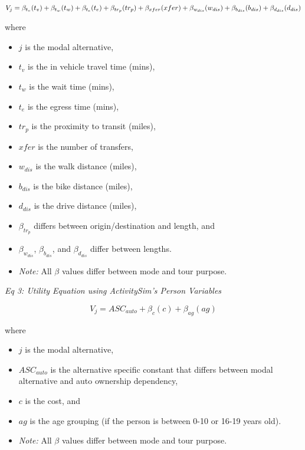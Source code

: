 \documentclass[]{elsarticle} %
\providecommand{\tightlist}{%
  \setlength{\itemsep}{0pt}\setlength{\parskip}{0pt}}
\begin{document}
\begin{equation}
  V_j = \beta_{t_v}(t_v) + \beta_{t_w}(t_w) + \beta_{t_e}(t_e) + \beta_{tr_p}(tr_p) + \beta_{xfer}(xfer) + \beta_{w_{dis}}(w_{dis}) + \\ \beta_{b_{dis}}(b_{dis}) + \beta_{d_{dis}}(d_{dis}) \label{eq:label2}
\end{equation}

where

\begin{itemize}
\tightlist
\item
  \(j\) is the modal alternative,
\item
  \(t_v\) is the in vehicle travel time (mins),
\item
  \(t_w\) is the wait time (mins),
\item
  \(t_e\) is the egress time (mins),
\item
  \(tr_p\) is the proximity to transit (miles),
\item
  \(xfer\) is the number of transfers,
\item
  \(w_{dis}\) is the walk distance (miles),
\item
  \(b_{dis}\) is the bike distance (miles),
\item
  \(d_{dis}\) is the drive distance (miles),
\item
  \(\beta_{tr_p}\) differs between origin/destination and length, and
\item
  \(\beta_{w_{dis}}\), \(\beta_{b_{dis}}\), and \(\beta_{d_{dis}}\) differ between lengths.
\item
  \emph{Note:} All \(\beta\) values differ between mode and tour purpose.
\end{itemize}

\emph{Eq 3: Utility Equation using ActivitySim's Person Variables}

\begin{equation}
  V_j = ASC_{auto} +  \beta_{c}(c) + \beta_{ag}(ag) \label{eq:label3}
\end{equation}

where

\begin{itemize}
\tightlist
\item
  \(j\) is the modal alternative,
\item
  \(ASC_{auto}\) is the alternative specific constant that differs between modal alternative and auto ownership dependency,
\item
  \(c\) is the cost, and
\item
  \(ag\) is the age grouping (if the person is between 0-10 or 16-19 years old).
\item
  \emph{Note:} All \(\beta\) values differ between mode and tour purpose.
\end{itemize}
\end{document}
